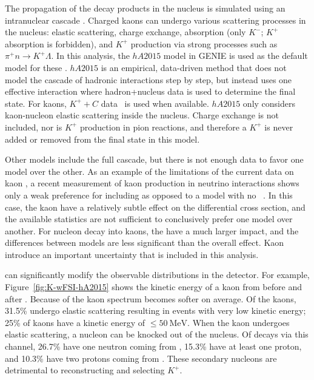 The propagation of the decay products in the nucleus is simulated using an intranuclear cascade . 
Charged kaons can undergo various scattering processes in the nucleus: elastic scattering, charge exchange, absorption (only $K^{-}$; $K^{+}$ absorption is forbidden), and $K^{+}$ production via strong processes such as $\pi^{+}n \rightarrow K^{+} \Lambda$.  In this analysis, the $hA2015$ model in GENIE is used as the default model for these .  $hA2015$ is an empirical, data-driven method that does not model the cascade of hadronic interactions step by step, but instead uses one effective interaction where hadron+nucleus data is used to determine the final state.
For kaons, $K^{+}+C$ data~\cite{Bugg:1968zz,Friedman:1997eq}
is used when available. $hA2015$ only considers kaon-nucleon elastic scattering inside the nucleus.  Charge exchange is not included, nor is $K^+$ production in pion reactions, and therefore a $K^+$ is never added or removed from the final state in this model. 

Other  models include the full cascade, but there is not enough data to favor one model over the other.  As an example of the limitations of the current data on kaon , a recent measurement of kaon production in neutrino interactions shows only a weak preference for including  as opposed to a model with no ~\cite{Marshall:2016rrn}.  In this case, the kaon  have a relatively subtle effect on the differential cross section, and the available statistics are not sufficient to conclusively prefer one model over another.  For nucleon decay into kaons, the  have a much larger impact, and the differences between models are less significant than the overall effect.  Kaon  introduce an important uncertainty that is included in this analysis.

 can significantly modify the observable distributions in the detector.  For example, Figure~\ref{fig:K-wFSI-hA2015} shows the kinetic energy of a kaon from \ptoknubar before and after . Because of  the kaon spectrum becomes softer on average. Of the kaons, \num{31.5}\%  undergo elastic scattering resulting in events with very low kinetic energy;  \num{25}\% of kaons have a kinetic energy of $\le\SI{50}{\MeV}$. When the kaon undergoes elastic scattering, a nucleon can be knocked out of the nucleus. Of decays via this channel, \num{26.7}\%  have one neutron coming from , \num{15.3}\% have at least one proton, and \num{10.3}\% have two protons coming from . These secondary nucleons are detrimental to reconstructing and selecting  $K^{+}$.

